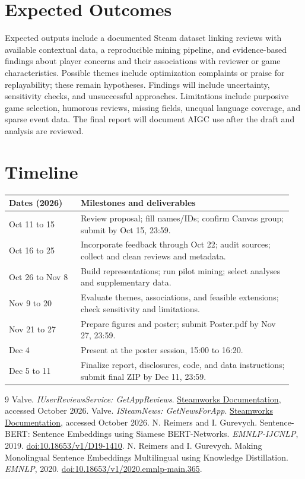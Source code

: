 \documentclass{article}
\begin{document}
\section{Expected Outcomes}
Expected outputs include a documented Steam dataset linking reviews with available contextual data, a reproducible mining pipeline, and evidence-based findings about player concerns and their associations with reviewer or game characteristics. Possible themes include optimization complaints or praise for replayability; these remain hypotheses. Findings will include uncertainty, sensitivity checks, and unsuccessful approaches. Limitations include purposive game selection, humorous reviews, missing fields, unequal language coverage, and sparse event data. The final report will document AIGC use after the draft and analysis are reviewed.

\section{Timeline}
\begin{center}
\small
\begin{tabular}{@{}p{0.24\linewidth}p{0.71\linewidth}@{}}
\toprule
Dates (2026) & Milestones and deliverables \\
\midrule
Oct 11 to 15 & Review proposal; fill names/IDs; confirm Canvas group; submit by Oct 15, 23:59. \\
Oct 16 to 25 & Incorporate feedback through Oct 22; audit sources; collect and clean reviews and metadata. \\
Oct 26 to Nov 8 & Build representations; run pilot mining; select analyses and supplementary data. \\
Nov 9 to 20 & Evaluate themes, associations, and feasible extensions; check sensitivity and limitations. \\
Nov 21 to 27 & Prepare figures and poster; submit Poster.pdf by Nov 27, 23:59. \\
Dec 4 & Present at the poster session, 15:00 to 16:20. \\
Dec 5 to 11 & Finalize report, disclosures, code, and data instructions; submit final ZIP by Dec 11, 23:59. \\
\bottomrule
\end{tabular}
\end{center}
\begin{thebibliography}{9}
\small
{} Valve. \emph{IUserReviewsService: GetAppReviews}. \href{https://partner.steamgames.com/doc/webapi/IUserReviewsService}{Steamworks Documentation}, accessed October 2026.
 Valve. \emph{ISteamNews: GetNewsForApp}. \href{https://partner.steamgames.com/doc/webapi/ISteamNews}{Steamworks Documentation}, accessed October 2026.
 N. Reimers and I. Gurevych. Sentence-BERT: Sentence Embeddings using Siamese BERT-Networks. \emph{EMNLP-IJCNLP}, 2019. \href{https://aclanthology.org/D19-1410/}{doi:10.18653/v1/D19-1410}.
 N. Reimers and I. Gurevych. Making Monolingual Sentence Embeddings Multilingual using Knowledge Distillation. \emph{EMNLP}, 2020. \href{https://aclanthology.org/2020.emnlp-main.365/}{doi:10.18653/v1/2020.emnlp-main.365}.
\end{thebibliography}
\end{document}

